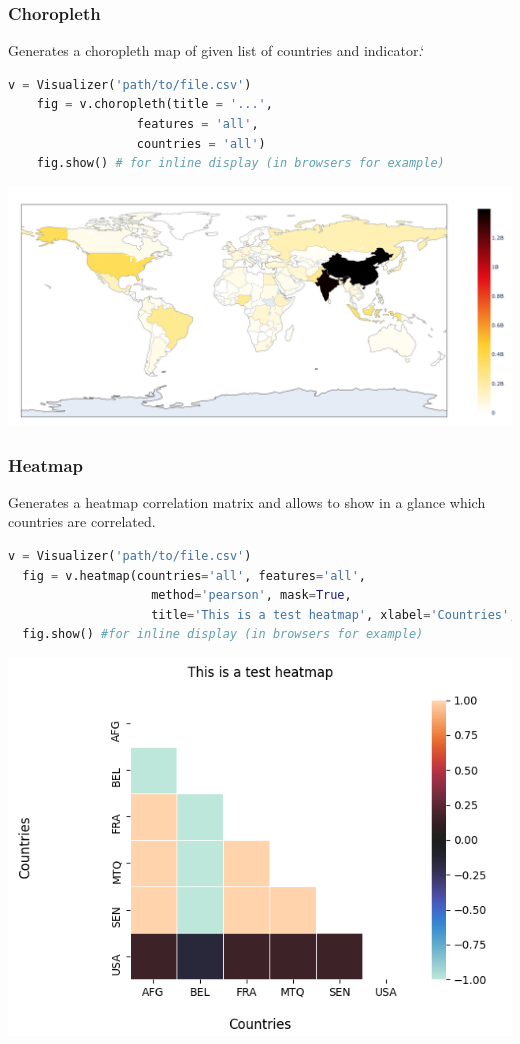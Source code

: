\begin{frame}[fragile,shrink=30]
   \frametitle{Choropleth}
   Generates a choropleth map of given list of countries and indicator.`
   \begin{lstlisting}[language=Python]
    v = Visualizer('path/to/file.csv')
    fig = v.choropleth(title = '...',
                  features = 'all',
                  countries = 'all')
    fig.show() # for inline display (in browsers for example)
    \end{lstlisting}
    \begin{center}
        \includegraphics[scale=0.4]{beamer/inc/graphics/choropleth.png} 
    \end{center}
\end{frame}

\begin{frame}[fragile,shrink=30]
  \frametitle{Heatmap}
  Generates a heatmap correlation matrix and allows to show in a glance which countries are correlated.
  \begin{lstlisting}[language=Python]
  v = Visualizer('path/to/file.csv')
  fig = v.heatmap(countries='all', features='all',
                    method='pearson', mask=True,
                    title='This is a test heatmap', xlabel='Countries', ylabel='Countries')
  fig.show() #for inline display (in browsers for example)
  \end{lstlisting}
  \begin{center}
    \includegraphics[scale=0.6]{beamer/inc/graphics/heatmap.png}
    \end{center}
\end{frame}

